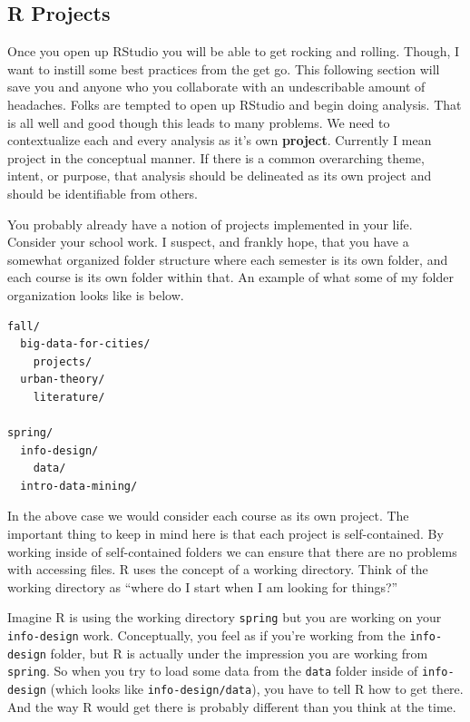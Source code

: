 \documentclass[
]{book}
\begin{document}
\hypertarget{r-projects}{%
\subsection{R Projects}\label{r-projects}}

Once you open up RStudio you will be able to get rocking and rolling. Though, I want to instill some best practices from the get go. This following section will save you and anyone who you collaborate with an undescribable amount of headaches.
Folks are tempted to open up RStudio and begin doing analysis. That is all well and good though this leads to many problems. We need to contextualize each and every analysis as it's own \textbf{project}. Currently I mean project in the conceptual manner. If there is a common overarching theme, intent, or purpose, that analysis should be delineated as its own project and should be identifiable from others.

You probably already have a notion of projects implemented in your life. Consider your school work. I suspect, and frankly hope, that you have a somewhat organized folder structure where each semester is its own folder, and each course is its own folder within that. An example of what some of my folder organization looks like is below.

\begin{verbatim}
fall/
  big-data-for-cities/
    projects/
  urban-theory/
    literature/
  
spring/
  info-design/
    data/
  intro-data-mining/
\end{verbatim}

In the above case we would consider each course as its own project. The important thing to keep in mind here is that each project is self-contained. By working inside of self-contained folders we can ensure that there are no problems with accessing files. R uses the concept of a working directory. Think of the working directory as ``where do I start when I am looking for things?''

Imagine R is using the working directory \texttt{spring} but you are working on your \texttt{info-design} work. Conceptually, you feel as if you're working from the \texttt{info-design} folder, but R is actually under the impression you are working from \texttt{spring}. So when you try to load some data from the \texttt{data} folder inside of \texttt{info-design} (which looks like \texttt{info-design/data}), you have to tell R how to get there. And the way R would get there is probably different than you think at the time.
\end{document}

